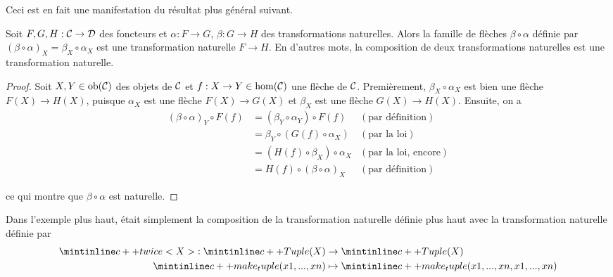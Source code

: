 Ceci est en fait une manifestation du résultat plus général suivant.
\begin{théorème}
    Soit $F,G,H : \mathcal{C} \to \mathcal{D}$ des foncteurs et $\alpha : F \to G$, $\beta : G \to H$
    des transformations naturelles. Alors la famille de flèches $\beta \circ \alpha$
    définie par $(\beta \circ \alpha)_X = \beta_X \circ \alpha_X$ est une
    transformation naturelle $F \to H$. En d'autres mots, la composition de
    deux transformations naturelles est une transformation naturelle.
\end{théorème}
\begin{proof}
    Soit $X, Y \in \mathrm{ob}(\mathcal{C})$ des objets de $\mathcal{C}$ et $f : X \to Y \in \hom(\mathcal{C})$
    une flèche de $\mathcal{C}$. Premièrement, $\beta_X \circ \alpha_X$ est bien une
    flèche $F(X) \to H(X)$, puisque $\alpha_X$ est une flèche $F(X) \to G(X)$
    et $\beta_X$ est une flèche $G(X) \to H(X)$. Ensuite, on a
    \begin{align*}
        (\beta \circ \alpha)_Y \circ F(f)
            &= (\beta_Y \circ \alpha_Y) \circ F(f) & (\text{par définition})\\
            &= \beta_Y \circ (G(f) \circ \alpha_X) & (\text{par la loi})    \\
            &= (H(f) \circ \beta_X) \circ \alpha_X & (\text{par la loi, encore})\\
            &= H(f) \circ (\beta \circ \alpha)_X   & (\text{par définition})
    \end{align*}

    ce qui montre que $\beta \circ \alpha$ est naturelle.
\end{proof}

Dans l'exemple plus haut,  était simplement la composition
de la transformation naturelle  définie plus haut avec la
transformation naturelle  définie par
\begin{align*}
    \icpp{twice<X>} : \icpp{Tuple(X)} &\to \icpp{Tuple(X)} \\
                      \icpp{make_tuple(x1, ..., xn)} &\mapsto \icpp{make_tuple(x1, ..., xn, x1, ..., xn)}
\end{align*}
